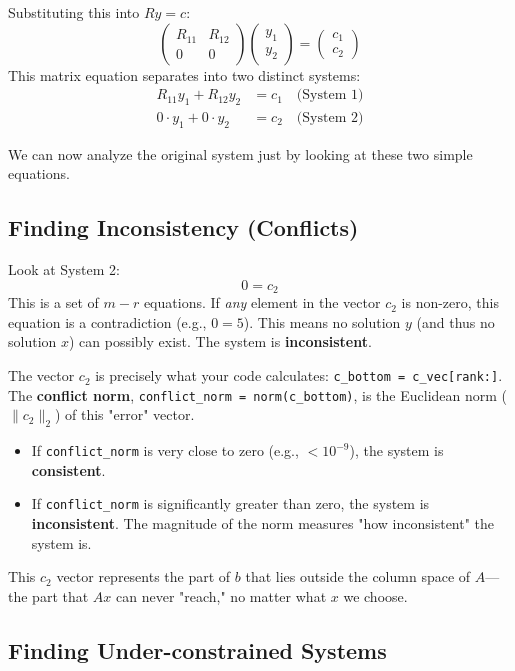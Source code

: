 \documentclass[11pt, a4paper]{article}
\begin{document}
Substituting this into $Ry = c$:
$$
\begin{pmatrix} R_{11} & R_{12} \\ 0 & 0 \end{pmatrix}
\begin{pmatrix} y_1 \\ y_2 \end{pmatrix}
=
\begin{pmatrix} c_1 \\ c_2 \end{pmatrix}
$$
This matrix equation separates into two distinct systems:
\begin{align}
    R_{11} y_1 + R_{12} y_2 &= c_1 \quad \text{(System 1)} \\
    0 \cdot y_1 + 0 \cdot y_2 &= c_2 \quad \text{(System 2)}
\end{align}

We can now analyze the original system just by looking at these two simple equations.

\subsection{Finding Inconsistency (Conflicts)}

Look at System 2:
$$
0 = c_2
$$
This is a set of $m-r$ equations. If \textit{any} element in the vector $c_2$ is non-zero, this equation is a contradiction (e.g., $0 = 5$). This means no solution $y$ (and thus no solution $x$) can possibly exist. The system is \textbf{inconsistent}.

The vector $c_2$ is precisely what your code calculates: \texttt{c\_bottom = c\_vec[rank:]}.
The \textbf{conflict norm}, \texttt{conflict\_norm = norm(c\_bottom)}, is the Euclidean norm ($\|c_2\|_2$) of this "error" vector.
\begin{itemize}
    \item If \texttt{conflict\_norm} is very close to zero (e.g., $< 10^{-9}$), the system is \textbf{consistent}.
    \item If \texttt{conflict\_norm} is significantly greater than zero, the system is \textbf{inconsistent}. The magnitude of the norm measures "how inconsistent" the system is.
\end{itemize}
This $c_2$ vector represents the part of $b$ that lies outside the column space of $A$---the part that $Ax$ can never "reach," no matter what $x$ we choose.

\subsection{Finding Under-constrained Systems}
\end{document}
